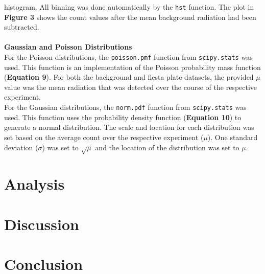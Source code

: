 \documentclass[
	letterpaper, %
	10pt, %
]{CSUniSchoolLabReport}
\begin{document}
histogram. All binning was done automatically by the \lstinline{hst} function. The plot in \textbf{Figure 3} shows the count
values after the mean background radiation had been subtracted.\\\\
{\large\textbf{Gaussian and Poisson Distributions}}\\
For the Poisson distributions, the \lstinline{poisson.pmf} function from \lstinline{scipy.stats} was used. This function is an implementation of the Poisson probability mass function (\textbf{Equation 9}). For both the background and fiesta plate datasets, the provided $\mu$ value was the mean radiation that was detected over the course of the respective experiment.\\

For the Gaussian distributions, the \lstinline{norm.pdf} function from \lstinline{scipy.stats} was used. This function uses the probability density function (\textbf{Equation 10}) to generate a normal distribution. The scale and location for each distribution was set based on the average count over the respective experiment ($\mu$). One standard deviation ($\sigma$) was set to $\sqrt\mu$ and the location of the distribution was set to $\mu$.
\newpage
\section{Analysis}
\section{Discussion}
\section{Conclusion}
\newpage
\end{document}
